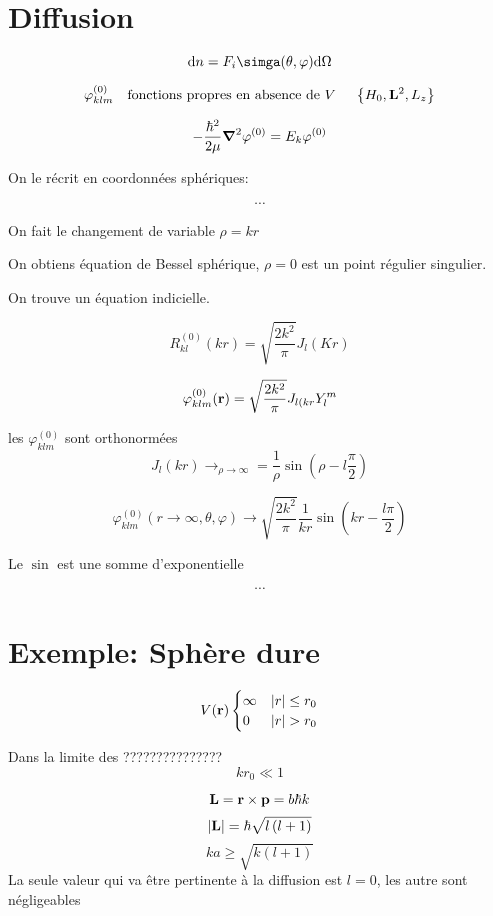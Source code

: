 


\section*{Diffusion}


$$\dd n = F_i \simga(\theta, \varphi)\dd \Omega$$ 


$$\varphi_{klm}^{(0)} \quad \text{fonctions propres en absence de $V$ } \quad \left\{ H_0, \vb{L}^2, L_z\right\} $$ 

$$-\frac{\hbar^2}{2\mu} \grad^2 \varphi^{(0)} = E_k \varphi^{(0)}$$ 

On le récrit en coordonnées sphériques:

$$\dotsb$$ 

On fait le changement de variable $\rho = kr$ 

On obtiens équation de Bessel sphérique, $\rho = 0$ est un point régulier singulier.


On trouve un équation indicielle.

$$R_{kl}^{(0)} (kr) = \sqrt{\frac{2k^2}{\pi}} J_l(Kr)$$ 

$$\varphi_{klm}^{(0)} ( \vb{r}) = \sqrt{\frac{2k^2}{\pi} }J_{l(kr} Y_l^m $$ 

les $\varphi_{klm}^{(0)}$ sont orthonormées 
$$J_l (kr) \to_{\rho\to\infty} = \frac{1}{\rho} \sin \left( \rho - l \frac{\pi}{2}  \right) $$ 

$$\varphi_{klm}^{(0)} (r\to \infty, \theta, \varphi) \to \sqrt{\frac{2k^2}{\pi} } \frac{1}{kr} \sin(kr -\frac{l\pi}{2} )$$ 

Le $\sin$ est une somme d'exponentielle

$$\dotsb$$ 



\section*{Exemple: Sphère dure}

$$V(\vb{r})\begin{cases}
	\infty & \abs{r} \leq r_0\\
	0 & \abs{r} > r_0 
\end{cases}$$ 

Dans la limite des ??????????????? $$kr_0 \ll 1$$ 

\begin{tcolorbox}[title=Parenthèse sur une formule]
	$$\vb{L} = \vb{r} \times \vb{p} = b\hbar k$$  
	$$\abs{\vb{L}} = \hbar\sqrt{l \left( l+1 \right) }$$ 
	$$ka \ge \sqrt{k(l+1)}$$ 
	La seule valeur qui va être pertinente à la diffusion est $l=0$, les autre sont négligeables 
\end{tcolorbox}




